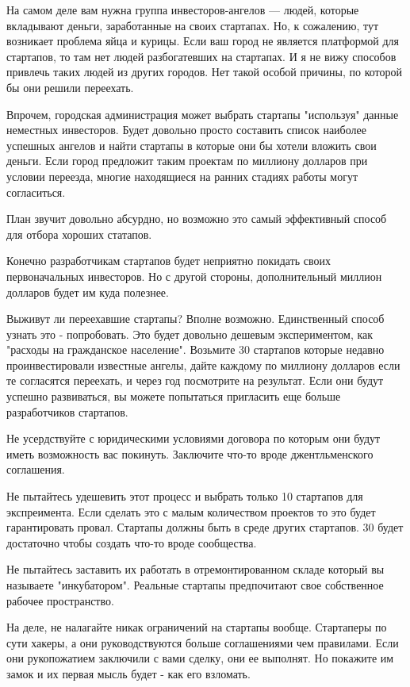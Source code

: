 \documentclass[ebook,12pt,oneside,openany]{memoir}
\begin{document}
На самом деле вам нужна группа инвесторов-ангелов — людей, которые
вкладывают деньги, заработанные на своих стартапах. Но, к сожалению,
тут возникает проблема яйца и курицы. Если ваш город не является
платформой для стартапов, то там нет людей разбогатевших на стартапах.
И я не вижу способов привлечь таких людей из других городов. Нет такой
особой причины, по которой бы они решили переехать.

Впрочем, городская администрация может выбрать стартапы "используя"
данные неместных инвесторов. Будет довольно просто составить список
наиболее успешных ангелов и найти стартапы в которые они бы хотели
вложить свои деньги. Если город предложит таким проектам по миллиону
долларов при условии переезда, многие находящиеся на ранних стадиях
работы могут согласиться.

План звучит довольно абсурдно, но возможно это самый эффективный
способ для отбора хороших статапов.

Конечно разработчикам стартапов будет неприятно покидать своих
первоначальных инвесторов. Но с другой стороны, дополнительный миллион
долларов будет им куда полезнее.

Выживут ли переехавшие стартапы? Вполне возможно. Единственный способ
узнать это - попробовать. Это будет довольно дешевым экспериментом,
как "расходы на гражданское население". Возьмите 30 стартапов которые
недавно проинвестировали известные ангелы, дайте каждому по миллиону
долларов если те согласятся переехать, и через год посмотрите на
результат. Если они будут успешно развиваться, вы можете попытаться
пригласить еще больше разработчиков стартапов.

Не усердствуйте с юридическими условиями договора по которым они будут
иметь возможность вас покинуть. Заключите что-то вроде джентльменского
соглашения.

Не пытайтесь удешевить этот процесс и выбрать только 10 стартапов для
экспреимента. Если сделать это с малым количеством проектов то это
будет гарантировать провал. Стартапы должны быть в среде других
стартапов. 30 будет достаточно чтобы создать что-то вроде сообщества.

Не пытайтесь заставить их работать в отремонтированном складе который
вы называете "инкубатором". Реальные стартапы предпочитают свое
собственное рабочее пространство.

На деле, не налагайте никак ограничений на стартапы вообще. Стартаперы
по сути хакеры, а они руководствуются больше соглашениями чем
правилами. Если они рукопожатием заключили с вами сделку, они ее
выполнят. Но покажите им замок и их первая мысль будет - как его
взломать.
\end{document}
